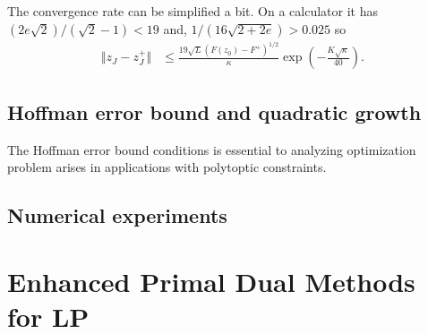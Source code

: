\documentclass[12pt]{report}
\begin{document}
        \begin{remark}
            The convergence rate can be simplified a bit. 
            On a calculator it has $(2e\sqrt{2})/(\sqrt{2} - 1) < 19$ and, $1/(16\sqrt{2 + 2e}) > 0.025$ so 
            \begin{align*}
                \Vert z_J - z_J^+\Vert &\le \frac{19\sqrt{L}(F(z_0) - F^+)^{1/2}}{\kappa}\exp\left(
                    - \frac{K\sqrt{\kappa}}{40}
                \right). 
            \end{align*}
        \end{remark}
    
    \section{Hoffman error bound and quadratic growth}
        The Hoffman error bound conditions is essential to analyzing optimization problem arises in applications with polytoptic constraints. 
        
    \section{Numerical experiments}
    
    
    
\chapter{Enhanced Primal Dual Methods for LP}
    






\end{document}
